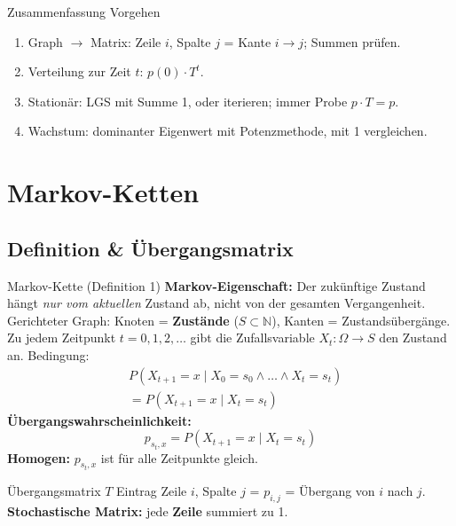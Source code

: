 \documentclass[a4paper, fontsize=7pt]{scrartcl}
\def\N{\mathbb{N}}  %
\begin{document}
\begin{subbox}{Zusammenfassung Vorgehen}
\begin{enumerate}
    \item Graph $\to$ Matrix: Zeile $i$, Spalte $j$ = Kante $i \to j$;
          Summen prüfen.
    \item Verteilung zur Zeit $t$: $p(0) \cdot T^t$.
    \item Stationär: LGS mit Summe 1, oder iterieren; immer Probe $p \cdot T = p$.
    \item Wachstum: dominanter Eigenwert mit Potenzmethode, mit 1 vergleichen.
\end{enumerate}
\end{subbox}

\section{Markov-Ketten}

\subsection{Definition \& Übergangsmatrix}

\begin{mainbox}{Markov-Kette (Definition 1)}
\textbf{Markov-Eigenschaft:} Der zukünftige Zustand hängt \emph{nur vom aktuellen}
Zustand ab, nicht von der gesamten Vergangenheit.\\
Gerichteter Graph: Knoten = \textbf{Zustände} ($S \subset \N$), Kanten =
Zustandsübergänge. Zu jedem Zeitpunkt $t = 0, 1, 2, \ldots$ gibt die Zufallsvariable
$X_t : \Omega \to S$ den Zustand an. Bedingung:
\begin{align*}
&P(X_{t+1} = x \mid X_0 = s_0 \wedge \ldots \wedge X_t = s_t)\\
&= P(X_{t+1} = x \mid X_t = s_t)
\end{align*}
\textbf{Übergangswahrscheinlichkeit:}
$$p_{s_t, x} = P(X_{t+1} = x \mid X_t = s_t)$$
\textbf{Homogen:} $p_{s_t, x}$ ist für alle Zeitpunkte gleich.
\end{mainbox}

\begin{mainbox}{Übergangsmatrix $T$}
Eintrag Zeile $i$, Spalte $j$ = $p_{i,j}$ = Übergang von $i$ nach $j$.\\
\textbf{Stochastische Matrix:} jede \textbf{Zeile} summiert zu 1.
\end{mainbox}
\end{document}

